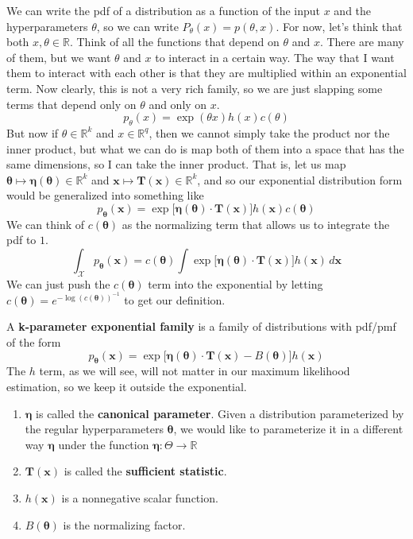   We can write the pdf of a distribution as a function of the input $x$ and the hyperparameters $\theta$, so we can write $P_\theta (x) = p(\theta, x)$. For now, let's think that both $x, \theta \in \mathbb{R}$. Think of all the functions that depend on $\theta$ and $x$. There are many of them, but we want $\theta$ and $x$ to interact in a certain way. The way that I want them to interact with each other is that they are multiplied within an exponential term. Now clearly, this is not a very rich family, so we are just slapping some terms that depend only on $\theta$ and only on $x$. 
  \[p_\theta (x) = \exp(\theta x) h(x) c(\theta)\]
  But now if $\theta \in \mathbb{R}^k$ and $x \in \mathbb{R}^q$, then we cannot simply take the product nor the inner product, but what we can do is map both of them into a space that has the same dimensions, so I can take the inner product. That is, let us map $\boldsymbol{\theta} \mapsto \boldsymbol{\eta}(\boldsymbol{\theta}) \in \mathbb{R}^k$ and $\mathbf{x} \mapsto \mathbf{T}(\mathbf{x}) \in \mathbb{R}^k$, and so 
  our exponential distribution form would be generalized into something like 
  \[p_{\boldsymbol{\theta}} (\mathbf{x}) = \exp\big[ \boldsymbol{\eta}(\boldsymbol{\theta}) \cdot \mathbf{T}(\mathbf{x}) \big] h(\mathbf{x}) c(\boldsymbol{\theta})\]
  We can think of $c(\boldsymbol{\theta})$ as the normalizing term that allows us to integrate the pdf to $1$. 
  \[\int_\mathcal{X} p_{\boldsymbol{\theta}} (\mathbf{x}) = c(\boldsymbol{\theta}) \int \exp\big[\boldsymbol{\eta}(\boldsymbol{\theta}) \cdot \mathbf{T}(\mathbf{x}) \big] h(\mathbf{x})  \,d\mathbf{x}\]
  We can just push the $c(\boldsymbol{\theta})$ term into the exponential by letting $c(\boldsymbol{\theta}) = e^{-\log(c(\boldsymbol{\theta}))^{-1}}$ to get our definition. 

  \begin{definition}
    A \textbf{k-parameter exponential family} is a family of distributions with pdf/pmf of the form 
    \[p_{\boldsymbol{\theta}} (\mathbf{x}) = \exp\big[ \boldsymbol{\eta}(\boldsymbol{\theta}) \cdot \mathbf{T}(\mathbf{x}) - B(\boldsymbol{\theta}) \big] h(\mathbf{x})\]
    The $h$ term, as we will see, will not matter in our maximum likelihood estimation, so we keep it outside the exponential. 
    \begin{enumerate}
      \item $\boldsymbol{\eta}$ is called the \textbf{canonical parameter}. Given a distribution parameterized by the regular hyperparameters $\boldsymbol{\theta}$, we would like to parameterize it in a different way $\boldsymbol{\eta}$ under the function $\boldsymbol{\eta}: \Theta \rightarrow \mathbb{R}$
      \item $\mathbf{T}(\mathbf{x})$ is called the \textbf{sufficient statistic}. 
      \item $h(\mathbf{x})$ is a nonnegative scalar function. 
      \item $B(\boldsymbol{\theta})$ is the normalizing factor. 
    \end{enumerate}
  \end{definition}

